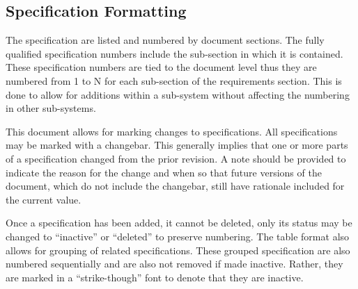 \subsection{Specification Formatting}
\label{ssec:Intro_SpecFormatting}

The specification are listed and numbered by document sections. 
The fully qualified specification numbers include the sub-section in which it is contained. 
These specification numbers are tied to the document level thus they are numbered from 1 to N for each sub-section of the requirements section. 
This is done to allow for additions within a sub-system without affecting the numbering in other sub-systems.

This document allows for marking changes to specifications.
All specifications may be marked with a changebar.
This generally implies that one or more parts of a specification changed from the prior revision.
A note should be provided to indicate the reason for the change and when so that future versions of the document, which do not include the changebar, still have rationale included for the current value.
 
Once a specification has been added, it cannot be deleted, only its status may be changed to ``inactive'' or ``deleted'' to preserve numbering.
The table format also allows for grouping of related specifications.
These grouped specification are also numbered sequentially and are also not removed if made inactive. 
Rather, they are marked in a ``strike-though'' font to denote that they are inactive.

